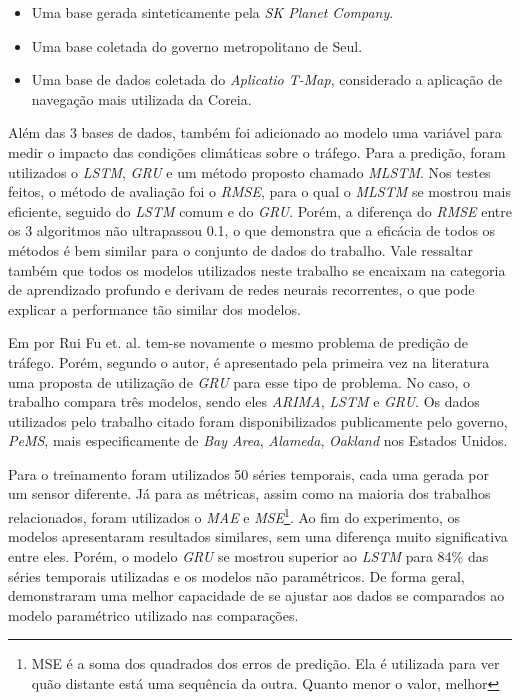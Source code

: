 \begin{itemize}
    \item Uma base gerada sinteticamente pela \textit{SK Planet Company}.
    \item Uma base coletada do governo metropolitano de Seul.
    \item Uma base de dados coletada do \textit{Aplicatio T-Map}, considerado a aplicação de navegação mais utilizada da Coreia.
\end{itemize} 

Além das 3 bases de dados, também foi adicionado ao modelo uma variável para medir o impacto das condições climáticas sobre o tráfego.
Para a predição, foram utilizados o \textit{\acrshort{LSTM}}, \textit{\acrshort{GRU}} e um método proposto chamado \textit{\acrfull{MLSTM}}. Nos testes feitos, o método de avaliação foi o \textit{\acrshort{RMSE}}, para o qual o \textit{\acrshort{MLSTM}} se mostrou mais eficiente, seguido do \textit{\acrshort{LSTM}} comum e do \textit{\acrshort{GRU}}. Porém, a diferença do \textit{\acrshort{RMSE}} entre os 3 algoritmos não ultrapassou 0.1, o que demonstra que a eficácia de todos os métodos é bem similar para o conjunto de dados do trabalho. Vale ressaltar também que todos os modelos utilizados neste trabalho se encaixam na categoria de aprendizado profundo e derivam de redes neurais recorrentes, o que pode explicar a performance tão similar dos modelos.

Em  \cite{fu2016using} por Rui Fu et. al. tem-se novamente o mesmo problema de predição de tráfego. Porém, segundo o autor, é apresentado pela primeira vez na literatura uma proposta de utilização de \textit{\acrshort{GRU}} para esse tipo de problema. No caso, o trabalho compara três modelos, sendo eles \textit{\acrshort{ARIMA}}, \textit{\acrshort{LSTM}} e \textit{\acrshort{GRU}}. Os dados utilizados pelo trabalho citado foram disponibilizados publicamente pelo governo, \textit{PeMS}, mais especificamente de \textit{Bay Area}, \textit{Alameda}, \textit{Oakland} nos Estados Unidos. 

Para o treinamento foram utilizados 50 séries temporais, cada uma gerada por um sensor diferente. Já para as métricas, assim como na maioria dos trabalhos relacionados, foram utilizados o \textit{\acrshort{MAE}} e \textit{\acrfull{MSE}}\footnote{MSE é a soma dos quadrados dos erros de predição. Ela é utilizada para ver quão distante está uma sequência da outra. Quanto menor o valor, melhor}. Ao fim do experimento, os modelos apresentaram resultados similares, sem uma diferença muito significativa entre eles. Porém, o modelo \textit{\acrshort{GRU}} se mostrou superior ao \textit{\acrshort{LSTM}} para 84\% das séries temporais utilizadas e os modelos não paramétricos. De forma geral, demonstraram uma melhor capacidade de se ajustar aos dados se comparados ao modelo paramétrico utilizado nas comparações.

